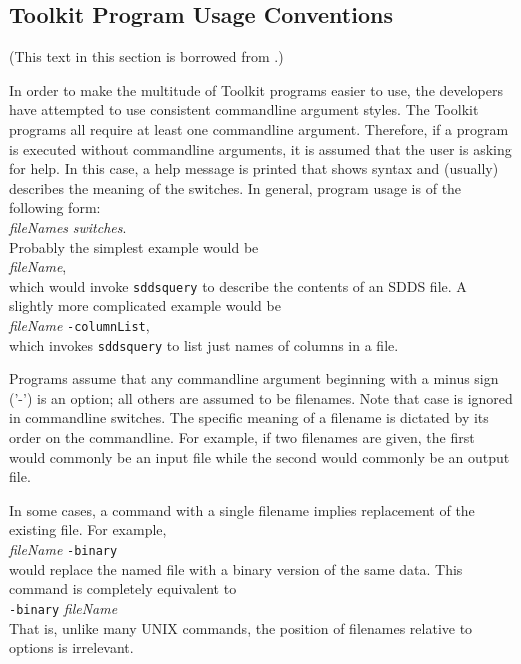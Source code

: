 \documentclass[11pt]{article}
\begin{document}
\subsection{Toolkit Program Usage Conventions}
(This text in this section is borrowed from \cite{SDDS_AP1.4}.)

In order to make the multitude of Toolkit programs easier to use, the
developers have attempted to use consistent commandline argument
styles.  The Toolkit programs all require at least one commandline
argument.  Therefore, if a program is executed without commandline
arguments, it is assumed that the user is asking for help.  In this
case, a help message is printed that shows syntax and (usually)
describes the meaning of the switches.  In general, program usage is
of the following form:\\
\hspace*{5mm}{\tt programName} {\em fileNames} {\em switches}.\\
Probably the simplest example would be \\ 
\hspace*{5mm}{\tt sddsquery } {\em fileName},\\
which would invoke {\tt sddsquery} to describe the contents of an SDDS file.
A slightly more complicated example would be\\
\hspace*{5mm}{\tt sddsquery } {\em fileName} {\tt -columnList},\\
which invokes {\tt sddsquery} to list just names of columns in a file.

Programs assume that any commandline argument beginning with a minus sign ('-') is an option; all others are
assumed to be filenames.  Note that case is ignored in commandline switches.  The specific meaning of a
filename is dictated by its order on the commandline.  For example, if two filenames are given, the first
would commonly be an input file while the second would commonly be an output file.  

In some cases, a command with a single filename implies replacement of the existing file.  For example,\\
\hspace*{5mm}{\tt sddsconvert} {\em fileName} {\tt -binary}\\
would replace the named file with a binary version of the same data.   This command is completely equivalent to\\
\hspace*{5mm}{\tt sddsconvert} {\tt -binary} {\em fileName} \\
That is, unlike many UNIX commands, the position of filenames relative to options is irrelevant.
\end{document}
